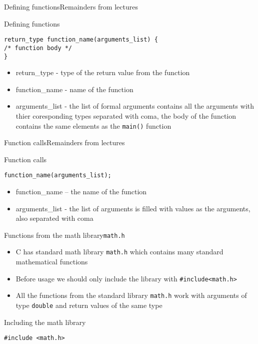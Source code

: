 


\begin{frame}[fragile]{Defining functions}{Remainders from lectures}
\begin{block}{Defining functions}
\begin{lstlisting}
return_type function_name(arguments_list) {
/* function body */
}
\end{lstlisting}
\end{block}
\begin{itemize}
    \item return\_type - type of the return value from the function
    \item function\_name - name of the function
    \item arguments\_list - the list of formal arguments contains all the
    arguments with thier coresponding types separated with coma, the body of the
    function contains the same elements as the \texttt{main()} function
\end{itemize}
\end{frame}

\begin{frame}[fragile]{Function calls}{Remainders from lectures}
\begin{block}{Function calls}
\begin{lstlisting}
function_name(arguments_list);
\end{lstlisting}
\end{block}
\begin{itemize}
    \item function\_name – the name of the function
    \item arguments\_list - the list of arguments is filled with values as the
    arguments, also separated with coma
\end{itemize}
\end{frame}

\begin{frame}[fragile]{Functions from the math library}{\texttt{math.h}}
\begin{itemize}
    \item C has standard math library \texttt{math.h} which contains many
    standard mathematical functions
    \item Before usage we should only include the library
    with \texttt{\#include<math.h>}
    \item All the functions from the standard library \texttt{math.h} work with
    arguments of type \texttt{double} and return values of the same type
\end{itemize}
\begin{block}{Including the math library}
\begin{lstlisting}
#include <math.h>
\end{lstlisting}
\end{block}
\end{frame}

